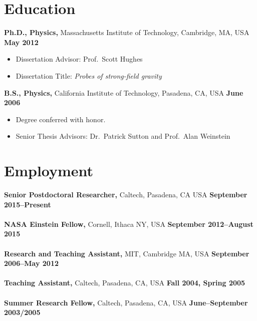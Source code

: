 \documentclass[margin,line]{res}
\begin{document}
\newcommand{\myname}{Leo C.~Stein}
\newlength{\mynamewidth}
\settowidth{\mynamewidth}{\namefont\myname}

\name{\hspace*{0.5\textwidth}\hspace{-0.5\mynamewidth} \myname \vspace*{.1in}}
\thispagestyle{empty}

\begin{resume}




\section{\sc Education}
{\bf Ph.D., Physics,} Massachusetts Institute of Technology, Cambridge, MA, USA \hfill {\bf May 2012}\\
\vspace*{-.1in}
\begin{itemize}
\item[ ] Dissertation Advisor: Prof.\ Scott Hughes
\item[ ] Dissertation Title: {\it Probes of strong-field gravity}
\end{itemize}

{\bf B.S., Physics,} California Institute of
Technology, Pasadena, CA, USA \hfill {\bf June 2006}\\
\vspace*{-.1in}
\begin{itemize}
\item[ ] Degree conferred with honor.
\item[ ] Senior Thesis Advisors: Dr.\ Patrick Sutton and Prof.\ Alan Weinstein
\end{itemize}

\section{\sc Employment}
{\bf Senior Postdoctoral Researcher,} Caltech, Pasadena, CA USA
\hfill {\bf September 2015--Present}\\
\\
{\bf NASA Einstein Fellow,} Cornell, Ithaca NY, USA
\hfill {\bf September 2012--August 2015}\\
\\
{\bf Research and Teaching Assistant,} MIT, Cambridge MA, USA \hfill {\bf September 2006--May 2012}\\
\\
{\bf Teaching Assistant,} Caltech, Pasadena, CA, USA \hfill {\bf  Fall 2004, Spring 2005}\\
\\
{\bf Summer Research Fellow,} Caltech, Pasadena, CA, USA \hfill {\bf  June--September 2003/2005}\\


\end{resume}
\end{document}
